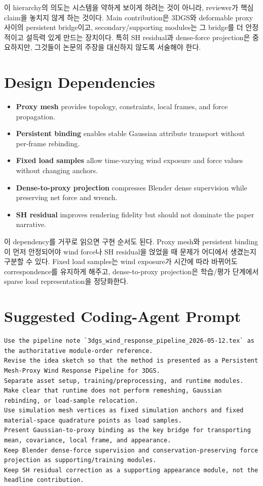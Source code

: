 \documentclass[11pt,a4paper]{article}
\begin{document}
이 hierarchy의 의도는 시스템을 약하게 보이게 하려는 것이 아니라, reviewer가 핵심 claim을 놓치지 않게 하는 것이다.
Main contribution은 3DGS와 deformable proxy 사이의 persistent bridge이고, secondary/supporting modules는 그 bridge를 더 안정적이고 설득력 있게 만드는 장치이다.
특히 SH residual과 dense-force projection은 중요하지만, 그것들이 논문의 주장을 대신하지 않도록 서술해야 한다.

\section{Design Dependencies}

\begin{itemize}[leftmargin=1.4em]
    \item \textbf{Proxy mesh} provides topology, constraints, local frames, and force propagation.
    \item \textbf{Persistent binding} enables stable Gaussian attribute transport without per-frame rebinding.
    \item \textbf{Fixed load samples} allow time-varying wind exposure and force values without changing anchors.
    \item \textbf{Dense-to-proxy projection} compresses Blender dense supervision while preserving net force and wrench.
    \item \textbf{SH residual} improves rendering fidelity but should not dominate the paper narrative.
\end{itemize}

이 dependency를 거꾸로 읽으면 구현 순서도 된다.
Proxy mesh와 persistent binding이 먼저 안정되어야 wind force나 SH residual을 얹었을 때 문제가 어디에서 생겼는지 구분할 수 있다.
Fixed load samples는 wind exposure가 시간에 따라 바뀌어도 correspondence를 유지하게 해주고, dense-to-proxy projection은 학습/평가 단계에서 sparse load representation을 정당화한다.

\section{Suggested Coding-Agent Prompt}

\begin{lstlisting}
Use the pipeline note `3dgs_wind_response_pipeline_2026-05-12.tex` as the authoritative module-order reference.
Revise the idea sketch so that the method is presented as a Persistent Mesh-Proxy Wind Response Pipeline for 3DGS.
Separate asset setup, training/preprocessing, and runtime modules.
Make clear that runtime does not perform remeshing, Gaussian rebinding, or load-sample relocation.
Use simulation mesh vertices as fixed simulation anchors and fixed material-space quadrature points as load samples.
Present Gaussian-to-proxy binding as the key bridge for transporting mean, covariance, local frame, and appearance.
Keep Blender dense-force supervision and conservation-preserving force projection as supporting/training modules.
Keep SH residual correction as a supporting appearance module, not the headline contribution.
\end{lstlisting}
\end{document}
